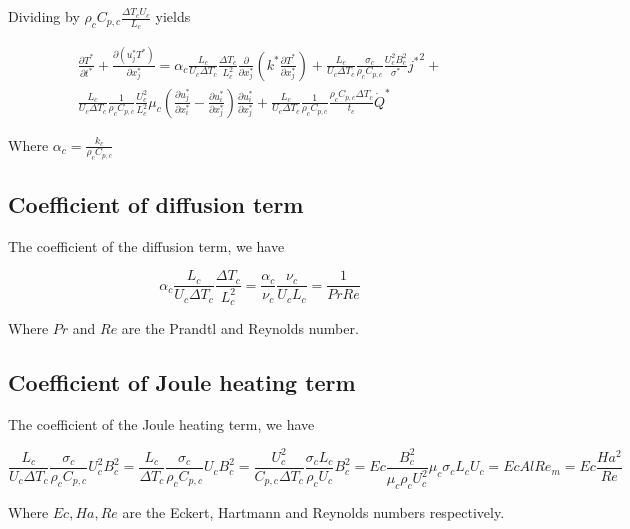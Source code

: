 \documentclass[11pt]{article}
\newcommand{\PD}{\partial}
\begin{document}
Dividing by $\rho_c C_{p,c} \frac{\Delta T_c U_c}{L_c}$ yields

\begin{multline}
	\frac{\PD T^*}{\PD t^*} +
	\frac{\PD (u_j^* T^*)}{\PD x_j^*}
	= 
	\alpha_c 
	\frac{L_c}{U_c \Delta T_c}
	\frac{\Delta T_c}{L_c^2}
	\frac{\PD}{\PD x_j^*}
	\left( k^* \frac{\PD T^*}{\PD x_j^*} \right) + 
	\frac{L_c}{U_c \Delta T_c}
	\frac{\sigma_c}{\rho_c C_{p,c}}
	\frac{U_c^2 B_c^2}{\sigma^*} {j^*}^2 + \\
	\frac{L_c}{U_c \Delta T_c}
	\frac{1}{\rho_c C_{p,c}}
	\frac{U_c^2}{L_c^2}\mu_c
	\left( \frac{\PD u_j^*}{\PD x_i^*} - \frac{\PD u_i^*}{\PD x_j^*} \right)
	\frac{\PD u_i^*}{\PD x_j^*} +
	\frac{L_c}{U_c \Delta T_c}
	\frac{1}{\rho_c C_{p,c}}
	\frac{\rho_c C_{p,c} \Delta T_c}{t_c}
	\dot{Q}^*
\end{multline}

Where $\alpha_c = \frac{k_c}{\rho_c C_{p,c}}$

\subsection{Coefficient of diffusion term}

The coefficient of the diffusion term, we have

\begin{equation}
\alpha_c  \frac{L_c}{U_c \Delta T_c} \frac{\Delta T_c}{L_c^2} =
\frac{\alpha_c}{\nu_c} \frac{\nu_c}{U_c L_c} = \frac{1}{Pr Re}
\end{equation}

Where $Pr$ and $Re$ are the Prandtl and Reynolds number.

\subsection{Coefficient of Joule heating term}

The coefficient of the Joule heating term, we have

\begin{equation}
\frac{L_c}{U_c \Delta T_c} \frac{\sigma_c}{\rho_c C_{p,c}} U_c^2 B_c^2 =
\frac{L_c}{\Delta T_c} \frac{\sigma_c}{\rho_c C_{p,c}} U_c B_c^2 =
\frac{U_c^2}{C_{p,c} \Delta T_c} \frac{\sigma_c L_c}{\rho_c U_c} B_c^2 =
Ec \frac{B_c^2}{\mu_c \rho_c U_c^2} \mu_c \sigma_c L_c U_c =
Ec Al Re_m = Ec \frac{Ha^2}{Re}
\end{equation}

Where $Ec,Ha,Re$ are the Eckert, Hartmann and Reynolds numbers respectively.
\end{document}

